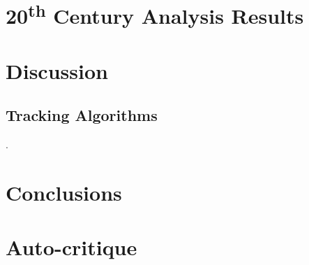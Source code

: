 \documentclass[pdftex,12pt,a4paper]{report}
\newcommand{\ts}{\textsuperscript}
\begin{document}
\chapter{20\ts{th} Century Analysis Results}

\chapter{Discussion}

\section{Tracking Algorithms}
\label{sec:discussion_tracking_algs}.

\chapter{Conclusions}

\chapter*{Auto-critique}

\printbibliography[title={References}]

\end{document}
